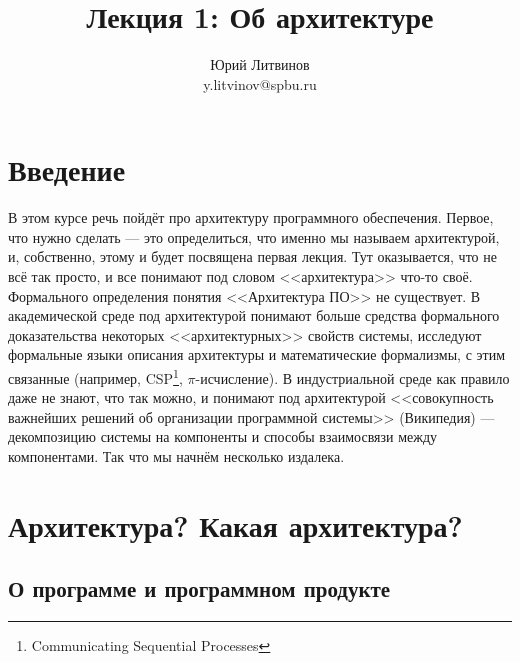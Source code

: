 \documentclass[a5paper]{article}
\title{Лекция 1: Об архитектуре}
\author{Юрий Литвинов\\\small{y.litvinov@spbu.ru}}
\date{}
\begin{document}
\maketitle
\thispagestyle{empty}

\section{Введение}

В этом курсе речь пойдёт про архитектуру программного обеспечения. Первое, что нужно сделать --- это определиться, что именно мы называем архитектурой, и, собственно, этому и будет посвящена первая лекция. Тут оказывается, что не всё так просто, и все понимают под словом <<архитектура>> что-то своё. Формального определения понятия <<Архитектура ПО>> не существует. В академической среде под архитектурой понимают больше средства формального доказательства некоторых <<архитектурных>> свойств системы, исследуют формальные языки описания архитектуры и математические формализмы, с этим связанные (например, CSP\footnote{Communicating Sequential Processes}, $\pi$-исчисление). В индустриальной среде как правило даже не знают, что так можно, и понимают под архитектурой <<совокупность важнейших решений об организации программной системы>> (\textcopyright Википедия) --- декомпозицию системы на компоненты и способы взаимосвязи между компонентами. Так что мы начнём несколько издалека.

\section{Архитектура? Какая архитектура?}

\subsection{О программе и программном продукте}
\end{document}
